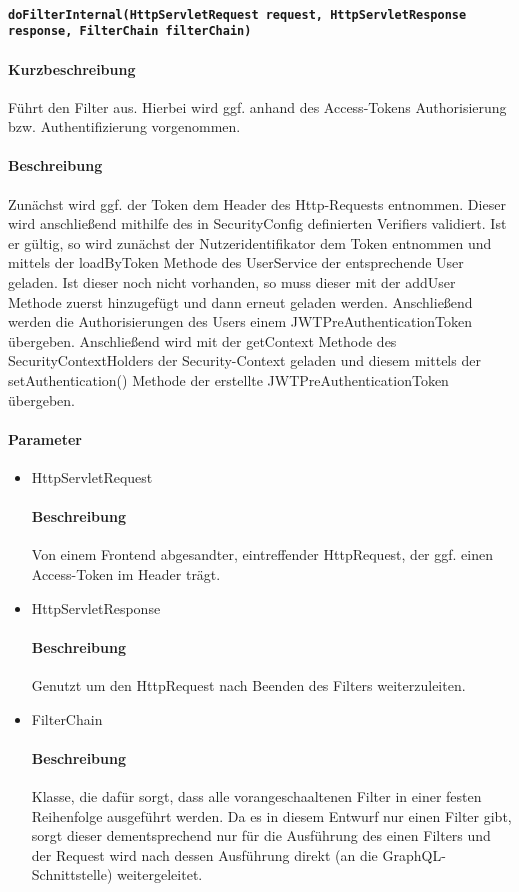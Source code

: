 \paragraph{\texttt{doFilterInternal(HttpServletRequest request, HttpServletResponse response, FilterChain filterChain)}}%
\paragraph*{Kurzbeschreibung}
Führt den Filter aus. Hierbei wird ggf. anhand des Access-Tokens Authorisierung bzw. Authentifizierung vorgenommen.
\paragraph*{Beschreibung}
Zunächst wird ggf. der Token dem Header des Http-Requests entnommen. Dieser wird anschließend mithilfe des in
\dq SecurityConfig \dq definierten Verifiers validiert. Ist er gültig, so wird zunächst der Nutzeridentifikator dem Token entnommen und mittels der \dq loadByToken \dq Methode 
des UserService der entsprechende User geladen. Ist dieser noch nicht vorhanden, so muss dieser mit der \dq addUser \dq Methode
zuerst hinzugefügt und dann erneut geladen werden. Anschließend werden die Authorisierungen des Users einem \dq 
JWTPreAuthenticationToken \dq übergeben. Anschließend wird mit der \dq getContext \dq Methode des SecurityContextHolders der 
Security-Context geladen und diesem mittels der \dq setAuthentication() \dq Methode der erstellte JWTPreAuthenticationToken 
übergeben. 

\paragraph*{Parameter}
\begin{itemize}
    \item HttpServletRequest
    		\paragraph*{Beschreibung}
            Von einem Frontend abgesandter, eintreffender HttpRequest, der ggf. einen Access-Token im Header trägt.
    \item HttpServletResponse
        	\paragraph*{Beschreibung}
            Genutzt um den HttpRequest nach Beenden des Filters weiterzuleiten.
    \item FilterChain
    		\paragraph*{Beschreibung}
            Klasse, die dafür sorgt, dass alle vorangeschaaltenen Filter in einer festen Reihenfolge ausgeführt werden. Da es in diesem Entwurf nur einen Filter gibt,
            sorgt dieser dementsprechend nur für die Ausführung des einen Filters und der Request wird nach dessen Ausführung direkt (an die GraphQL-Schnittstelle) weitergeleitet.

\end{itemize}

